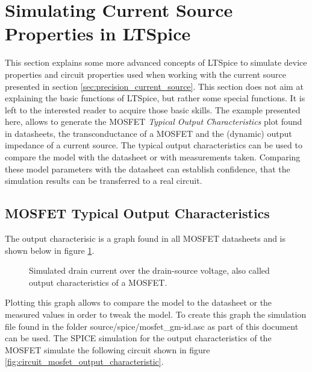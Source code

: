 \documentclass[12pt]{book}
\providecommand{\external}[1]{\textsf{#1}}
\begin{document}
\section{Simulating Current Source Properties in LTSpice}
\label{sec:ltspice_current_source}
This section explains some more advanced concepts of LTSpice \cite{ltspice} to simulate device properties and circuit properties used when working with the current source presented in section \ref{sec:precision_current_source}. This section does not aim at explaining the basic functions of LTSpice, but rather some special functions. It is left to the interested reader to acquire those basic skills. The example presented here, allows to generate the MOSFET \textit{Typical Output Characteristics} plot found in datasheets, the transconductance of a MOSFET and the (dynamic) output impedance of a current source. The typical output characteristics can be used to compare the model with the datasheet or with measurements taken. Comparing these model parameters with the datasheet can establish confidence, that the simulation results can be transferred to a real circuit.

\subsection{MOSFET Typical Output Characteristics}
The output characterisic is a graph found in all MOSFET datasheets and is shown below in figure \ref{fig:ltspice_mosfet_drain_current_example}.

\begin{figure}[hb]
    \centering
    
    \caption{Simulated drain current over the drain-source voltage, also called output characteristics of a MOSFET.}
    \label{fig:ltspice_mosfet_drain_current_example}
\end{figure}

Plotting this graph allows to compare the model to the datasheet or the measured values in order to tweak the model. To create this graph the simulation file found in the folder \external{source/spice/mosfet\_gm-id.asc} as part of this document can be used. The SPICE simulation for the output characteristics of the MOSFET simulate the following circuit shown in figure \ref{fig:circuit_mosfet_output_characteristic}.
\end{document}
